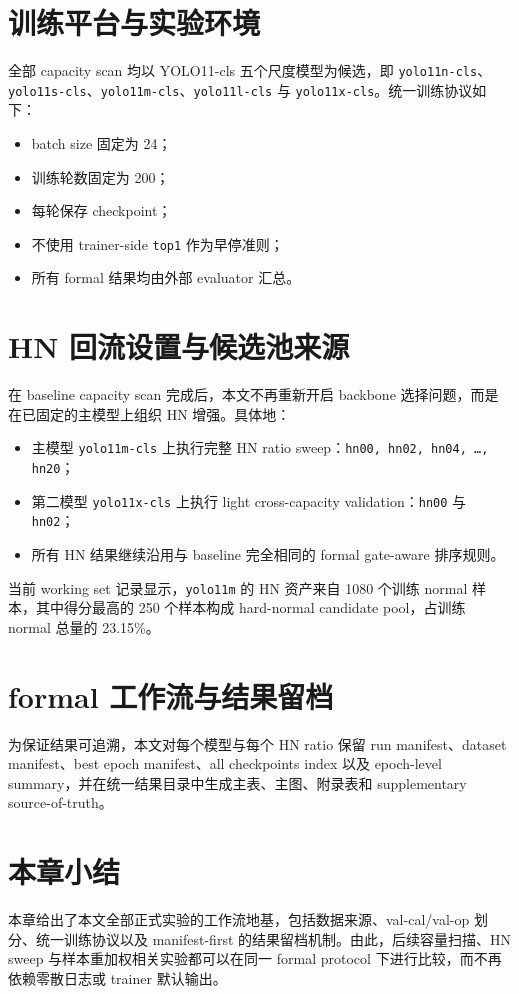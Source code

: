 \documentclass[UTF8,openany,12pt]{ctexbook}
\newcommand{\formalmetric}[1]{\texttt{#1}}
\begin{document}
\section{训练平台与实验环境}
全部 capacity scan 均以 YOLO11-cls 五个尺度模型为候选，即 \texttt{yolo11n-cls}、\texttt{yolo11s-cls}、\texttt{yolo11m-cls}、\texttt{yolo11l-cls} 与 \texttt{yolo11x-cls}。统一训练协议如下：
\begin{itemize}
    \item batch size 固定为 24；
    \item 训练轮数固定为 200；
    \item 每轮保存 checkpoint；
    \item 不使用 trainer-side \formalmetric{top1} 作为早停准则；
    \item 所有 formal 结果均由外部 evaluator 汇总。
\end{itemize}

\section{HN 回流设置与候选池来源}
在 baseline capacity scan 完成后，本文不再重新开启 backbone 选择问题，而是在已固定的主模型上组织 HN 增强。具体地：
\begin{itemize}
    \item 主模型 \texttt{yolo11m-cls} 上执行完整 HN ratio sweep：\texttt{hn00, hn02, hn04, \ldots, hn20}；
    \item 第二模型 \texttt{yolo11x-cls} 上执行 light cross-capacity validation：\texttt{hn00} 与 \texttt{hn02}；
    \item 所有 HN 结果继续沿用与 baseline 完全相同的 formal gate-aware 排序规则。
\end{itemize}

当前 working set 记录显示，\texttt{yolo11m} 的 HN 资产来自 1080 个训练 normal 样本，其中得分最高的 250 个样本构成 hard-normal candidate pool，占训练 normal 总量的 23.15\%。

\section{formal 工作流与结果留档}
为保证结果可追溯，本文对每个模型与每个 HN ratio 保留 run manifest、dataset manifest、best epoch manifest、all checkpoints index 以及 epoch-level summary，并在统一结果目录中生成主表、主图、附录表和 supplementary source-of-truth。

\section{本章小结}
本章给出了本文全部正式实验的工作流地基，包括数据来源、val-cal/val-op 划分、统一训练协议以及 manifest-first 的结果留档机制。由此，后续容量扫描、HN sweep 与样本重加权相关实验都可以在同一 formal protocol 下进行比较，而不再依赖零散日志或 trainer 默认输出。
\end{document}
